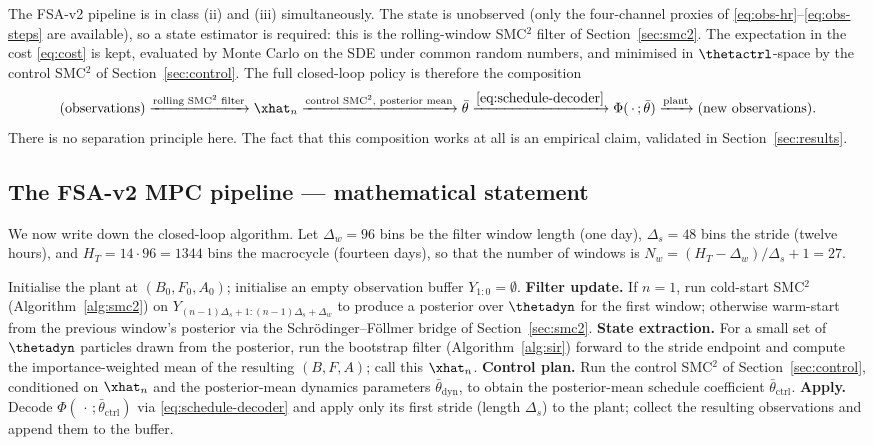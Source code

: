 The FSA-v2 pipeline is in class (ii) and (iii) simultaneously. The state
is unobserved (only the four-channel proxies of
\eqref{eq:obs-hr}--\eqref{eq:obs-steps} are available), so a state
estimator is required: this is the rolling-window SMC${}^2$ filter of
Section~\ref{sec:smc2}. The expectation in the cost \eqref{eq:cost} is
kept, evaluated by Monte Carlo on the SDE under common random numbers,
and minimised in $\thetactrl$-space by the control SMC${}^2$ of
Section~\ref{sec:control}. The full closed-loop policy is therefore the
composition
\[
  \text{(observations)}
    \xrightarrow{\text{rolling SMC${}^2$ filter}} \xhat_n
    \xrightarrow{\text{control SMC${}^2$, posterior mean}} \bar\theta
    \xrightarrow{\eqref{eq:schedule-decoder}} \Phi(\,\cdot\,;\bar\theta)
    \xrightarrow{\text{plant}} \text{(new observations)}.
\]
There is no separation principle here. The fact that this composition
works at all is an empirical claim, validated in
Section~\ref{sec:results}.

\subsection{The FSA-v2 MPC pipeline --- mathematical statement}\label{sec:mpc-pipeline}

We now write down the closed-loop algorithm. Let $\Delta_w = 96$ bins be
the filter window length (one day), $\Delta_s = 48$ bins the stride
(twelve hours), and $H_T = 14 \cdot 96 = 1344$ bins the macrocycle
(fourteen days), so that the number of windows is
$N_w = (H_T - \Delta_w)/\Delta_s + 1 = 27$.

\begin{algorithm}[H]
\caption{FSA-v2 closed-loop MPC}
\label{alg:fsa-mpc}
\begin{algorithmic}[1]
\State Initialise the plant at $(B_0,F_0,A_0)$; initialise an empty
       observation buffer $Y_{1:0} = \emptyset$.
  \State \textbf{Filter update.} If $n=1$, run cold-start SMC${}^2$
         (Algorithm~\ref{alg:smc2}) on $Y_{(n-1)\Delta_s+1:(n-1)\Delta_s+\Delta_w}$
         to produce a posterior over $\thetadyn$ for the first window;
         otherwise warm-start from the previous window's posterior via
         the Schr\"odinger--F\"ollmer bridge of Section~\ref{sec:smc2}.
  \State \textbf{State extraction.} For a small set of $\thetadyn$
         particles drawn from the posterior, run the bootstrap filter
         (Algorithm~\ref{alg:sir}) forward to the stride endpoint and
         compute the importance-weighted mean of the resulting
         $(B,F,A)$; call this $\xhat_n$.
  \State \textbf{Control plan.} Run the control SMC${}^2$ of
         Section~\ref{sec:control}, conditioned on $\xhat_n$ and the
         posterior-mean dynamics parameters $\bar\theta_{\mathrm{dyn}}$,
         to obtain the posterior-mean schedule coefficient
         $\bar\theta_{\mathrm{ctrl}}$.
  \State \textbf{Apply.} Decode
         $\Phi(\,\cdot\,;\bar\theta_{\mathrm{ctrl}})$ via
         \eqref{eq:schedule-decoder} and apply only its first stride
         (length $\Delta_s$) to the plant; collect the resulting
         observations and append them to the buffer.
\EndFor
\end{algorithmic}
\end{algorithm}

